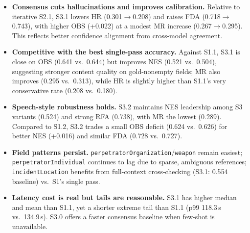 \begin{itemize}
    \item \textbf{Consensus cuts hallucinations and improves calibration.} Relative to iterative S2.1, S3.1 lowers HR (0.301$\rightarrow$0.208) and raises FDA (0.718$\rightarrow$0.743), with higher OBS (+0.022) at a modest MR increase (0.267$\rightarrow$0.295). This reflects better confidence alignment from cross-model agreement.
    \item \textbf{Competitive with the best single-pass accuracy.} Against S1.1, S3.1 is close on OBS (0.641 vs.\ 0.644) but improves NES (0.521 vs.\ 0.504), suggesting stronger content quality on gold-nonempty fields; MR also improves (0.295 vs.\ 0.313), while HR is slightly higher than S1.1’s very conservative rate (0.208 vs.\ 0.180).
    \item \textbf{Speech-style robustness holds.} S3.2 maintains NES leadership among S3 variants (0.524) and strong RFA (0.738), with MR the lowest (0.289). Compared to S1.2, S3.2 trades a small OBS deficit (0.624 vs.\ 0.626) for better NES (+0.016) and similar FDA (0.728 vs.\ 0.727).
    \item \textbf{Field patterns persist.} \texttt{perpetratorOrganization}/\texttt{weapon} remain easiest; \texttt{perpetratorIndividual} continues to lag due to sparse, ambiguous references; \texttt{incidentLocation} benefits from full-context cross-checking (S3.1: 0.554 baseline) vs.\ S1’s single pass.
    \item \textbf{Latency cost is real but tails are reasonable.} S3.1 has higher median and mean than S1.1, yet a shorter extreme tail than S1.1 (p99 118.3\,s vs.\ 134.9\,s). S3.0 offers a faster consensus baseline when few-shot is unavailable.
\end{itemize}

